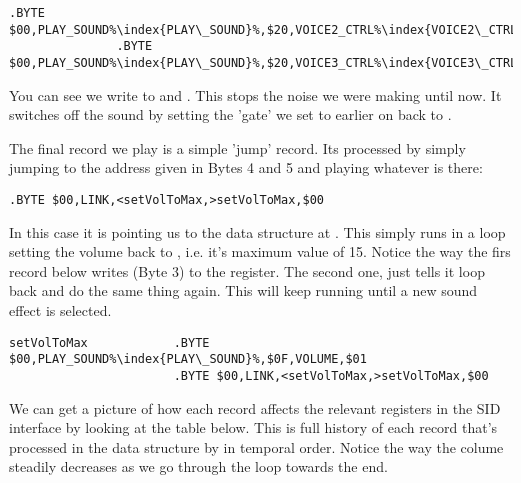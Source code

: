\begin{lstlisting}[escapechar=\%]
               .BYTE $00,PLAY_SOUND%\index{PLAY\_SOUND}%,$20,VOICE2_CTRL%\index{VOICE2\_CTRL}%,$00
               .BYTE $00,PLAY_SOUND%\index{PLAY\_SOUND}%,$20,VOICE3_CTRL%\index{VOICE3\_CTRL}%,$00
\end{lstlisting}

You can see we write  to  and . This stops the noise we were making
until now. It switches off the sound by setting the 'gate' we set to  earlier on back to .

The final record we play is a simple 'jump' record. Its processed by simply jumping to the address given in Bytes 4 and
5 and playing whatever is there:

\begin{lstlisting}[escapechar=\%]
              .BYTE $00,LINK,<setVolToMax,>setVolToMax,$00
\end{lstlisting}

In this case it is pointing us to the data structure at . This simply runs in a loop setting the volume
back to , i.e. it's maximum value of 15. Notice the way the firs record below writes  (Byte 3) to the
 register. The second one, just tells it loop back and do the same thing again. This will keep running until
a new sound effect is selected.

\begin{lstlisting}[escapechar=\%]
setVolToMax            .BYTE $00,PLAY_SOUND%\index{PLAY\_SOUND}%,$0F,VOLUME,$01
                       .BYTE $00,LINK,<setVolToMax,>setVolToMax,$00
\end{lstlisting}

We can get a picture of how each record affects the relevant registers in the SID interface by looking at the table below.
This is full history of each record that's processed in the  data structure by 
in temporal order. Notice the way the colume steadily decreases as we go through the  loop towards the end.

